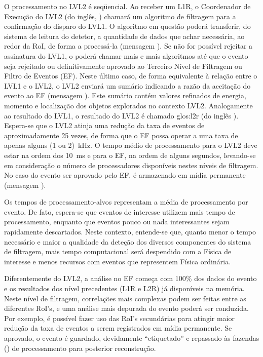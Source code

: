 O processamento no LVL2 é seqüencial. Ao receber um L1R, o Coordenador de
Execução do LVL2 (do inglês, ) chamará um algoritmo de filtragem
para a confirmação do disparo do LVL1. O algoritmo em questão poderá
transferir, do sistema de leitura do detetor, a quantidade de dados que achar
necessária, ao redor da RoI, de forma a processá-la (mensagem ). Se
não for possível rejeitar a assinatura do LVL1, o  poderá chamar
mais e mais algoritmos até que o evento seja rejeitado ou definitivamente
aprovado ao Terceiro Nível de Filtragem ou Filtro de Eventos (EF). Neste
último caso, de forma equivalente à relação entre o LVL1 e o LVL2, o LVL2
enviará um sumário indicando a razão da aceitação do evento ao EF (mensagem
). Este sumário contém valores refinados de energia, momento e
localização dos objetos explorados no contexto LVL2. Analogamente ao resultado
do LVL1, o resultado do LVL2 é chamado \gls{glos:l2r} (do inglês ). Espera-se que o LVL2 atinja uma redução da taxa de eventos de
aproximadamente 25 vezes, de forma que o EF possa operar a uma taxa de apenas
alguns (1 ou 2)~kHz. O tempo médio de processamento para o LVL2 deve estar na
ordem dos 10~ms e para o EF, na ordem de alguns segundos, levando-se em
consideração o número de processadores disponíveis nestes níveis de
filtragem. No caso do evento ser aprovado pelo EF, é armazenado em mídia
permanente (mensagem
).

Os tempos de processamento-alvos representam a média de processamento por
evento. De fato, espera-se que eventos de interesse utilizem mais tempo de
processamento, enquanto que eventos pouco ou nada interessantes sejam
rapidamente descartados. Neste contexto, entende-se que, quanto menor o tempo
necessário e maior a qualidade da deteção dos diversos componentes do sistema
de filtragem, mais tempo computacional será despendido com a Física de
interesse e menos recursos com eventos que representem Física ordinária.

Diferentemente do LVL2, a análise no EF começa com 100\% dos dados do evento e
os resultados dos nível precedentes (L1R e L2R) já disponíveis na
memória. Neste nível de filtragem, correlações mais complexas podem ser feitas
entre as diferentes RoI's, e uma análise mais depurada do evento poderá ser
conduzida. Por exemplo, é possível fazer uso das RoI's secundárias para
atingir maior redução da taxa de eventos a serem registrados em mídia
permanente. Se aprovado, o evento é guardado, devidamente ``etiquetado'' e
repassado às fazendas () de processamento  para
posterior reconstrução.

